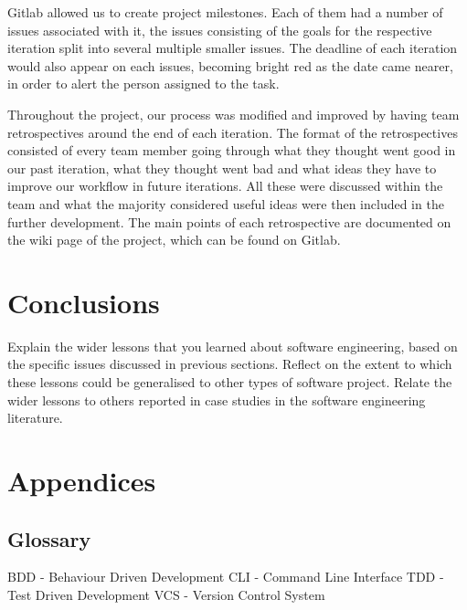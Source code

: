 \documentclass{l3proj}
\begin{document}
Gitlab allowed us to create project milestones. Each of them had a number of issues associated with it, the issues consisting of the goals for the respective iteration split into several multiple smaller issues. The deadline of each iteration would also appear on each issues, becoming bright red as the date came nearer, in order to alert the person assigned to the task.

Throughout the project, our process was modified and improved by having team retrospectives around the end of each iteration. The format of the retrospectives consisted of every team member going through what they thought went good in our past iteration, what they thought went bad and what ideas they have to improve our workflow in future iterations. All these were discussed within the team and what the majority considered useful ideas were then included in the further development. The main points of each retrospective are documented on the wiki page of the project, which can be found on Gitlab.



\newpage
\section{Conclusions}
\label{sec:conclusion}


Explain the wider lessons that you learned about software engineering,
based on the specific issues discussed in previous sections.  Reflect
on the extent to which these lessons could be generalised to other
types of software project.  Relate the wider lessons to others
reported in case studies in the software engineering literature.


\section{Appendices}
\label{sec:appendices}

\subsection{Glossary}
\label{subsec:appendices:glossary}
BDD - Behaviour Driven Development
CLI - Command Line Interface
TDD - Test Driven Development
VCS - Version Control System




\end{document}

